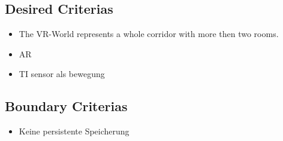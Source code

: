 \subsection{Desired Criterias}

\begin{itemize}
  \item The VR-World represents a whole corridor with more then two rooms.
  \item AR
  \item TI sensor als bewegung
\end{itemize}

\subsection{Boundary Criterias}

\begin{itemize}
  \item Keine persistente Speicherung
\end{itemize}
